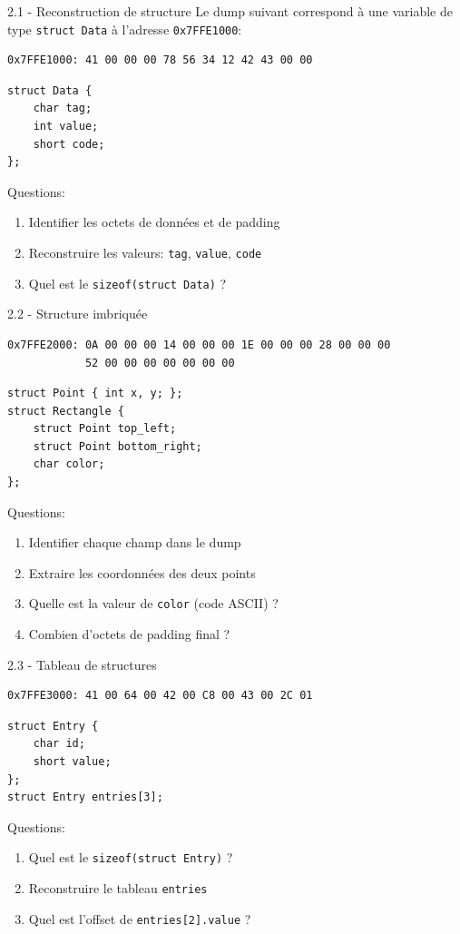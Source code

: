 \documentclass[10pt,a4paper]{article}
\begin{document}
\begin{exercicebox}{2.1 - Reconstruction de structure}
Le dump suivant correspond à une variable de type \texttt{struct Data} à l'adresse \texttt{0x7FFE1000}:

\begin{verbatim}
0x7FFE1000: 41 00 00 00 78 56 34 12 42 43 00 00
\end{verbatim}

\begin{lstlisting}
struct Data {
    char tag;
    int value;
    short code;
};
\end{lstlisting}

Questions:
\begin{enumerate}
\item Identifier les octets de données et de padding
\item Reconstruire les valeurs: \texttt{tag}, \texttt{value}, \texttt{code}
\item Quel est le \texttt{sizeof(struct Data)} ?
\end{enumerate}
\end{exercicebox}

\begin{exercicebox}{2.2 - Structure imbriquée}
\begin{verbatim}
0x7FFE2000: 0A 00 00 00 14 00 00 00 1E 00 00 00 28 00 00 00
            52 00 00 00 00 00 00 00
\end{verbatim}

\begin{lstlisting}
struct Point { int x, y; };
struct Rectangle {
    struct Point top_left;
    struct Point bottom_right;
    char color;
};
\end{lstlisting}

Questions:
\begin{enumerate}
\item Identifier chaque champ dans le dump
\item Extraire les coordonnées des deux points
\item Quelle est la valeur de \texttt{color} (code ASCII) ?
\item Combien d'octets de padding final ?
\end{enumerate}
\end{exercicebox}

\begin{exercicebox}{2.3 - Tableau de structures}
\begin{verbatim}
0x7FFE3000: 41 00 64 00 42 00 C8 00 43 00 2C 01
\end{verbatim}

\begin{lstlisting}
struct Entry {
    char id;
    short value;
};
struct Entry entries[3];
\end{lstlisting}

Questions:
\begin{enumerate}
\item Quel est le \texttt{sizeof(struct Entry)} ?
\item Reconstruire le tableau \texttt{entries}
\item Quel est l'offset de \texttt{entries[2].value} ?
\end{enumerate}
\end{exercicebox}
\end{document}
